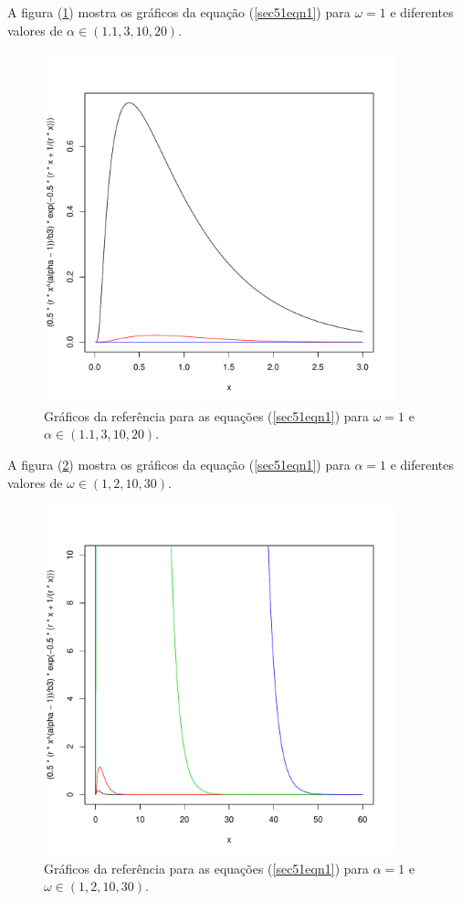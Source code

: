 \documentclass[10pt,a4paper]{article}
\begin{document}
A figura (\ref{sec51fig2}) mostra os gráficos da equação (\ref{sec51eqn1}) para $\omega=1$ e diferentes valores de $\alpha\in(1.1,3,10,20)$. 

\begin{figure}[!htb]
\centering
\includegraphics[width=4.0in]{fig1_freitas_frery_2005.pdf}
	\caption{Gráficos da referência \cite{freitas_frery_2005} para as equações (\ref{sec51eqn1}) para $\omega=1$ e $\alpha\in(1.1,3,10,20)$.}
\label{sec51fig2}
\end{figure}

A figura (\ref{sec51fig3}) mostra os gráficos da equação (\ref{sec51eqn1}) para $\alpha=1$ e diferentes valores de $\omega\in(1,2,10,30)$. 

\begin{figure}[!htb]
\centering
\includegraphics[width=4.0in]{fig2_freitas_frery_2005.pdf}
	\caption{Gráficos da referência \cite{freitas_frery_2005} para as equações (\ref{sec51eqn1}) para $\alpha=1$ e $\omega\in(1,2,10,30)$.}
\label{sec51fig3}
\end{figure}
\end{document}
